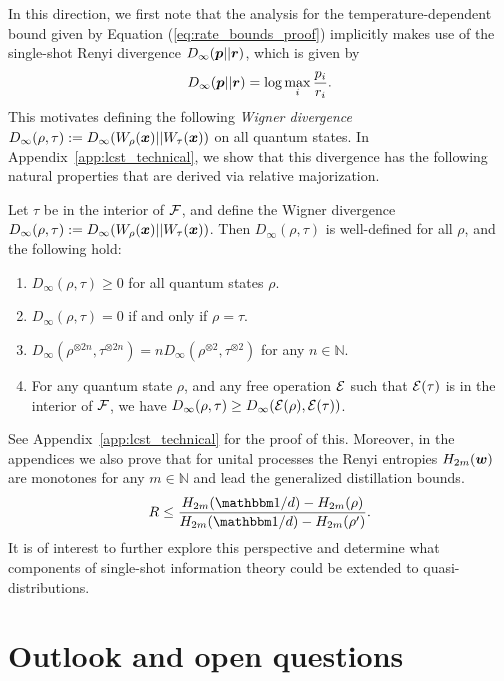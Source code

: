 \documentclass[pra,
aps,
twocolumn,
superscriptaddress,
groupedaddress,
nofootinbib,
reprint
]{revtex4-1}
\begin{document}
In this direction, we first note that the analysis for the temperature-dependent bound given by Equation (\ref{eq:rate_bounds_proof}) implicitly makes use of the single-shot Renyi divergence $D_\infty (\boldsymbol{p} ||\boldsymbol{r})$, which is given by
\begin{equation}
D_\infty (\boldsymbol{p} ||\boldsymbol{r}) = \log \max_i \frac{p_i}{r_i}.
\end{equation}
This motivates defining the following \emph{Wigner divergence} $D_\infty(\rho, \tau) := D_\infty (W_\rho(\boldsymbol{x}) || W_\tau (\boldsymbol{x}))$ on all quantum states. In Appendix~\ref{app:lcst_technical}, we show that this divergence has the following natural properties that are derived via relative majorization.
\begin{theorem} Let $\tau$ be in the interior of ${\mathcal F}$, and define the Wigner divergence $D_\infty(\rho,\tau) := D_\infty(W_\rho(\boldsymbol{x}) || W_\tau (\boldsymbol{x}))$. Then $D_\infty(\rho, \tau)$ is well-defined for all $\rho$, and the following hold:
\begin{enumerate}
\item $D_\infty(\rho, \tau) \ge 0$ for all quantum states $\rho$.
\item  $D_\infty(\rho , \tau) = 0$ if and only if $\rho =\tau$.
\item $D_\infty(\rho^{\otimes 2n}, \tau^{\otimes 2n}) = n D_\infty(\rho^{\otimes 2} ,\tau^{\otimes 2})$ for any $n \in \mathbb{N}$.
\item For any quantum state $\rho$, and any free operation ${\mathcal E}$ such that ${\mathcal E}(\tau)$ is in the interior of ${\mathcal F}$, we have $D_\infty (\rho , \tau) \ge D_\infty ({\mathcal E}(\rho), {\mathcal E}(\tau))$.
\end{enumerate}
\end{theorem}
See Appendix~\ref{app:lcst_technical} for the proof of this. Moreover, in the appendices we also prove that for unital processes the Renyi entropies $H_{2m}(\boldsymbol{w})$ are monotones for any $m \in \mathbb{N}$ and lead the generalized distillation bounds.
\begin{equation}
R \le \frac{H_{2m}(\I/d)- H_{2m}(\rho)}{H_{2m}(\I/d)-H_{2m}(\rho')}.
\end{equation}
It is of interest to further explore this perspective and determine what components of single-shot information theory could be extended to quasi-distributions.

\section{Outlook and open questions}
\label{sec:lower_bounds}
\end{document}
